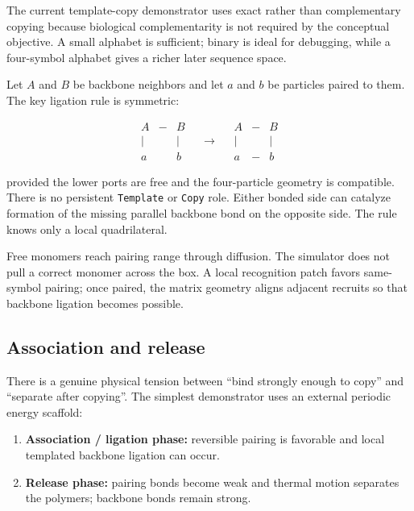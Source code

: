 \documentclass[10pt,a4paper]{article}
\newcommand{\code}[1]{\texttt{#1}}
\begin{document}
The current template-copy demonstrator uses exact rather than complementary copying because biological complementarity is not required by the conceptual objective. A small alphabet is sufficient; binary is ideal for debugging, while a four-symbol alphabet gives a richer later sequence space.

Let $A$ and $B$ be backbone neighbors and let $a$ and $b$ be particles paired to them. The key ligation rule is symmetric:

\[
\begin{array}{ccc}
A & {-} & B\\[-1mm]
| & & |\\[-1mm]
a & & b
\end{array}
\quad \longrightarrow \quad
\begin{array}{ccc}
A & {-} & B\\[-1mm]
| & & |\\[-1mm]
a & {-} & b
\end{array}
\]

provided the lower ports are free and the four-particle geometry is compatible. There is no persistent \code{Template} or \code{Copy} role. Either bonded side can catalyze formation of the missing parallel backbone bond on the opposite side. The rule knows only a local quadrilateral.

Free monomers reach pairing range through diffusion. The simulator does not pull a correct monomer across the box. A local recognition patch favors same-symbol pairing; once paired, the matrix geometry aligns adjacent recruits so that backbone ligation becomes possible.

\subsection{Association and release}

There is a genuine physical tension between ``bind strongly enough to copy'' and ``separate after copying''. The simplest demonstrator uses an external periodic energy scaffold:

\begin{enumerate}
\item \textbf{Association / ligation phase:} reversible pairing is favorable and local templated backbone ligation can occur.
\item \textbf{Release phase:} pairing bonds become weak and thermal motion separates the polymers; backbone bonds remain strong.
\end{enumerate}
\end{document}
